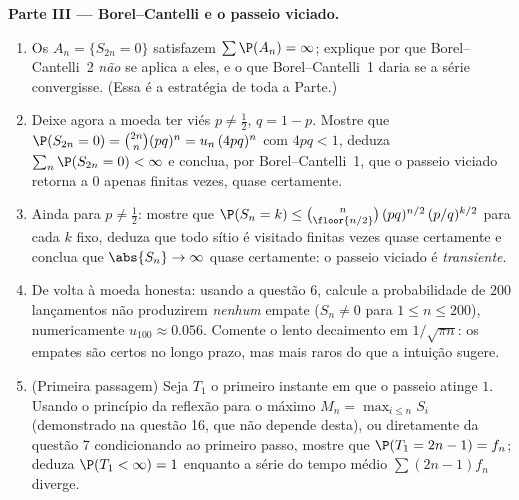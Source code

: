 \begin{problem}
\medskip
\noindent\textbf{Parte III --- Borel--Cantelli e o passeio
viciado.}
\begin{enumerate}[resume]
  \item Os  $A_n = \{S_{2n} = 0\}$ satisfazem $\sum\P(A_n)
        = \infty$; explique por que Borel--Cantelli~2
        \emph{não} se aplica a eles, e o que Borel--Cantelli~1
        daria se a série convergisse. (Essa é a
        estratégia de toda a Parte.)
  \item Deixe agora a moeda ter viés $p \neq \frac12$, $q = 1 -
        p$. Mostre que $\P(S_{2n} = 0) = \binom{2n}n(pq)^n =
        u_n\,(4pq)^n$ com $4pq < 1$, deduza
        $\sum_n\P(S_{2n} = 0) < \infty$ e conclua, por
        Borel--Cantelli~1, que o passeio viciado retorna a $0$
        apenas finitas vezes, quase certamente.
  \item Ainda para $p \neq \frac12$: mostre que $\P(S_n = k) \leq
        \binom{n}{\floor{n/2}}\,(pq)^{n/2}\,(p/q)^{k/2}$ para
        cada $k$ fixo, deduza que todo sítio é visitado
        finitas vezes quase certamente e conclua que
        $\abs{S_n} \to \infty$ quase certamente: o passeio viciado
        é \emph{transiente}.
  \item De volta à moeda honesta: usando a questão 6, calcule a
        probabilidade de $200$ lançamentos não produzirem \emph{nenhum} empate
        ($S_n \neq 0$ para $1 \leq n \leq 200$), numericamente
        $u_{100} \approx 0.056$. Comente o lento
        decaimento em $1/\sqrt{\pi n}$: os empates são certos no longo
        prazo, mas mais raros do que a intuição sugere.
  \item (Primeira passagem) Seja $T_1$ o primeiro instante em que o passeio
        atinge $1$. Usando o princípio da reflexão para o
        máximo $M_n = \max_{i\leq n}S_i$ (demonstrado na questão
        16, que não depende desta), ou diretamente
        da questão 7 condicionando ao primeiro passo,
        mostre que $\P(T_1 = 2n - 1) = f_n$; deduza $\P(T_1 <
        \infty) = 1$ enquanto a série do tempo médio
        $\sum(2n-1)f_n$ diverge.
\end{enumerate}


\end{problem}
